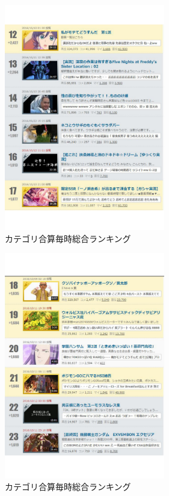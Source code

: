 \begin{figure}[htb]
\centering
\includegraphics[width=7cm]{r03.pdf}
\caption{カテゴリ合算毎時総合ランキング}\label{aad}
\end{figure}

\begin{figure}[htb]
\centering
\includegraphics[width=7cm]{r04.pdf}
\caption{カテゴリ合算毎時総合ランキング}\label{aae}
\end{figure}

